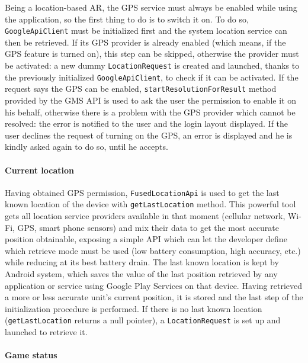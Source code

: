			Being a location-based AR, the GPS service must always be enabled while using the application, so the first thing to do is to switch it on.
			To do so, \lstinline|GoogleApiClient| must be initialized first and the system location service can then be retrieved.
			If its GPS provider is already enabled (which means, if the GPS feature is turned on), this step can be skipped, otherwise the provider must be activated: a new dummy \lstinline|LocationRequest| is created and launched, thanks to the previously initialized \lstinline|GoogleApiClient|, to check if it can be activated.
			If the request says the GPS can be enabled,  \lstinline|startResolutionForResult| method provided by the GMS API is used to ask the user the permission to enable it on his behalf, otherwise there is a problem with the GPS provider which cannot be resolved: the error is notified to the user and the login layout displayed.
			If the user declines the request of turning on the GPS, an error is displayed and he is kindly asked again to do so, until he accepts.
			
			\paragraph{Current location}
			
			Having obtained GPS permission, \lstinline|FusedLocationApi| is used to get the last known location of the device with \lstinline|getLastLocation| method.
			This powerful tool gets all location service providers available in that moment (cellular network, Wi-Fi, GPS, smart phone sensors) and mix their data to get the most accurate position obtainable, exposing a simple API which can let the developer define which retrieve mode must be used (low battery consumption, high accuracy, etc.) while reducing at its best battery drain.
			The last known location is kept by Android system, which saves the value of the last position retrieved by any application or service using Google Play Services on that device.
			Having retrieved a more or less accurate unit's current position, it is stored and the last step of the initialization procedure is performed.
			If there is no last known location (\lstinline|getLastLocation| returns a null pointer), a \lstinline|LocationRequest| is set up and launched to retrieve it.
			
			\paragraph{Game status}
			
